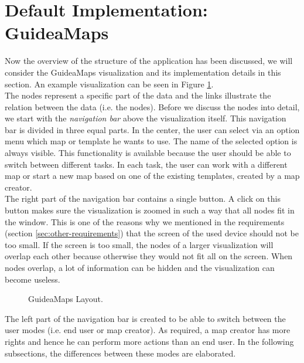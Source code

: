 \section{Default Implementation: GuideaMaps}
Now the overview of the structure of the application has been discussed, we will consider the GuideaMaps visualization and its implementation details in this section. An example visualization can be seen in Figure \ref{fig:guideamaps}.\\

The nodes represent a specific part of the data and the links illustrate the relation between the data (i.e. the nodes). Before we discuss the nodes into detail, we start with the \textit{navigation bar} above the visualization itself. This navigation bar is divided in three equal parts. In the center, the user can select via an option menu which map or template he wants to use. The name of the selected option is always visible. This functionality is available because the user should be able to switch between different tasks. In each task, the user can work with a different map or start a new map based on one of the existing templates, created by a map creator.\\

The right part of the navigation bar contains a single button. A click on this button makes sure the visualization is zoomed in such a way that all nodes fit in the window. This is one of the reasons why we mentioned in the requirements (section \ref{sec:other-requirements}) that the screen of the used device should not be too small. If the screen is too small, the nodes of a larger visualization will overlap each other because otherwise they would not fit all on the screen. When nodes overlap, a lot of information can be hidden and the visualization can become useless.

\begin{figure}[h]
	\centering
	\caption{GuideaMaps Layout.}
	\label{fig:guideamaps}
\end{figure}

The left part of the navigation bar is created to be able to switch between the user modes (i.e. end user or map creator). As required, a map creator has more rights and hence he can perform more actions than an end user. In the following subsections, the differences between these modes are elaborated.





